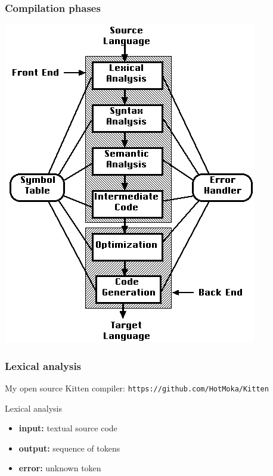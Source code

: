\documentclass[11pt]{beamer}  %
\begin{document}
\begin{frame}
\frametitle{Compilation phases}

\begin{center}
\includegraphics[scale=0.4]{pictures/compilation_phases.jpg}
\end{center}

\end{frame}

\begin{frame}
\frametitle{Lexical analysis}

\begin{center}
My open source Kitten compiler: \texttt{https://github.com/HotMoka/Kitten}
\end{center}

\begin{center}
\begin{redbox}{Lexical analysis}
\begin{itemize}
\item \textbf{input:} textual source code
\item \textbf{output:} sequence of tokens
\item \textbf{error:} unknown token
\end{itemize}
\end{redbox}
\end{center}

\end{frame}
\end{document}
